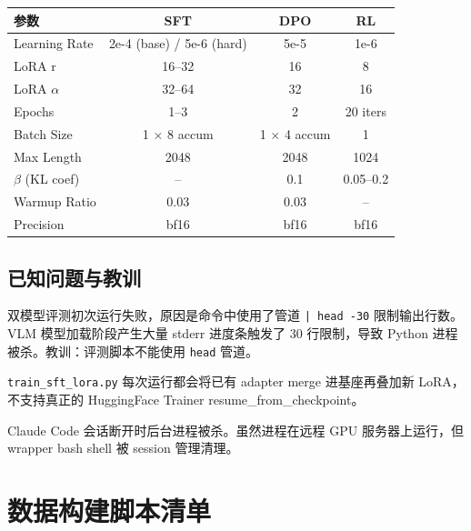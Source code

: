\documentclass[12pt,a4paper]{ctexart}
\begin{document}
\begin{table}[H]
\centering
\begin{tabular}{lccc}
\toprule
参数 & SFT & DPO & RL \\
\midrule
Learning Rate & 2e-4 (base) / 5e-6 (hard) & 5e-5 & 1e-6 \\
LoRA r & 16--32 & 16 & 8 \\
LoRA $\alpha$ & 32--64 & 32 & 16 \\
Epochs & 1--3 & 2 & 20 iters \\
Batch Size & 1 $\times$ 8 accum & 1 $\times$ 4 accum & 1 \\
Max Length & 2048 & 2048 & 1024 \\
$\beta$ (KL coef) & -- & 0.1 & 0.05--0.2 \\
Warmup Ratio & 0.03 & 0.03 & -- \\
Precision & bf16 & bf16 & bf16 \\
\bottomrule
\end{tabular}
\end{table}

\subsection{已知问题与教训}

\begin{description}[nosep]
  \item[\texttt{| head -30} Bug] 双模型评测初次运行失败，原因是命令中使用了管道 \texttt{| head -30} 限制输出行数。VLM 模型加载阶段产生大量 stderr 进度条触发了 30 行限制，导致 Python 进程被杀。教训：评测脚本不能使用 \texttt{head} 管道。
  \item[Resume 缺陷] \texttt{train\_sft\_lora.py} 每次运行都会将已有 adapter merge 进基座再叠加新 LoRA，不支持真正的 HuggingFace Trainer resume\_from\_checkpoint。
  \item[Session 断连] Claude Code 会话断开时后台进程被杀。虽然进程在远程 GPU 服务器上运行，但 wrapper bash shell 被 session 管理清理。
\end{description}

\section{数据构建脚本清单}
\end{document}
